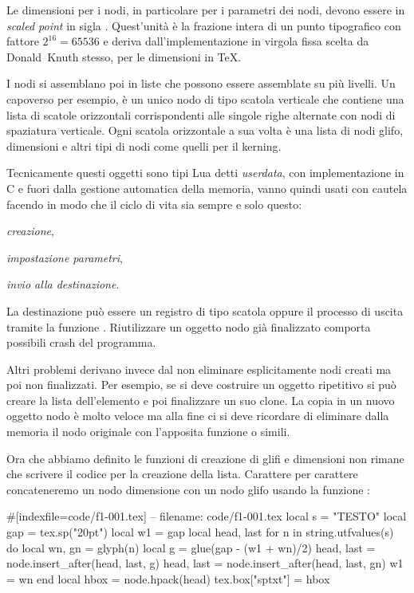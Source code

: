 Le dimensioni per i nodi, in particolare per i parametri dei nodi, devono essere
in \emph{scaled point} in sigla . Quest'unità è la frazione intera di un
punto tipografico con fattore \( 2^{16}  = 65536 \) e deriva
dall'implementazione in virgola fissa scelta da Donald~Knuth stesso, per le
dimensioni in \TeX.

I nodi si assemblano poi in liste che possono essere assemblate su più livelli.
Un capoverso per esempio, è un unico nodo di tipo scatola verticale che contiene
una lista di scatole orizzontali corrispondenti alle singole righe alternate con
nodi di spaziatura verticale. Ogni scatola orizzontale a sua volta è una lista
di nodi glifo, dimensioni e altri tipi di nodi come quelli per il kerning.

Tecnicamente questi oggetti sono tipi Lua detti \emph{userdata}, con
implementazione in C e fuori dalla gestione automatica della memoria, vanno
quindi usati con cautela facendo in modo che il ciclo di vita sia sempre e solo
questo:
\begin{compactenumerate}
\item \emph{creazione}, 
\item \emph{impostazione parametri},
\item \emph{invio alla destinazione}.
\end{compactenumerate}

La destinazione può essere un registro di tipo scatola oppure il processo di
uscita tramite la funzione . Riutilizzare un oggetto nodo già
finalizzato comporta possibili crash del programma.

Altri problemi derivano invece dal non eliminare esplicitamente nodi creati ma
poi non finalizzati. Per esempio, se si deve costruire un oggetto ripetitivo si
può creare la lista dell'elemento e poi finalizzare un suo clone. La copia in un
nuovo oggetto nodo è molto veloce ma alla fine ci si deve ricordare di eliminare
dalla memoria il nodo originale con l'apposita funzione
 o simili.

Ora che abbiamo definito le funzioni di creazione di glifi e dimensioni non
rimane che scrivere il codice per la creazione della lista. Carattere per
carattere concateneremo un nodo dimensione con un nodo glifo usando la funzione
:
\begin{lines}
#[indexfile=code/f1-001.tex]
-- filename: code/f1-001.tex
local s = "TESTO"
local gap = tex.sp("20pt")
local w1 = gap
local head, last
for n in string.utfvalues(s) do
    local wn, gn = glyph(n)
    local g = glue(gap - (w1 + wn)/2)
    head, last = node.insert_after(head, last, g)
    head, last = node.insert_after(head, last, gn)
    w1 = wn
end
local hbox = node.hpack(head)
tex.box["sptxt"] = hbox
\end{lines}

